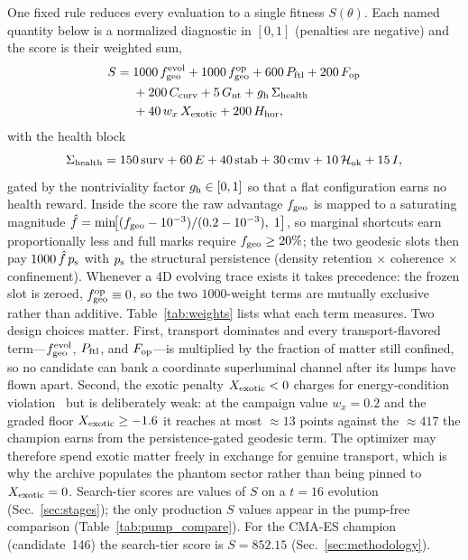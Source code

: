\documentclass[twocolumn,floatfix,aps,prd,nofootinbib]{revtex4-2}
\begin{document}
One fixed rule reduces every evaluation to a single fitness $S(\theta)$. Each
named quantity below is a normalized diagnostic in $[0,1]$ (penalties are
negative) and the score is their weighted sum,
\begin{align}
S =\;& 1000\,f_{\rm geo}^{\rm evol}
      + 1000\,f_{\rm geo}^{\rm op}
      + 600\,P_{\rm ftl}
      + 200\,F_{\rm op} \nonumber\\
   &  + 200\,C_{\rm curv}
      + 5\,G_{\rm nt}
      + g_{\rm h}\,\Sigma_{\rm health}\nonumber\\
   &  + 40\,w_{x}\,X_{\rm exotic}
      + 200\,H_{\rm hor},
\label{eq:score}
\end{align}
with the health block
\begin{equation}
\Sigma_{\rm health}=150\,\mathrm{surv}+60\,E+40\,\mathrm{stab}
+30\,\mathrm{cmv}+10\,\mathcal H_{\rm ok}+15\,I,
\end{equation}
gated by the nontriviality factor $g_{\rm h}\in[0,1]$ so that a flat
configuration earns no health reward. Inside the score the raw advantage
$f_{\rm geo}$ is mapped to a saturating magnitude
$\hat f=\min\!\bigl[(f_{\rm geo}-10^{-3})/(0.2-10^{-3}),\;1\bigr]$, so marginal
shortcuts earn proportionally less and full marks require
$f_{\rm geo}\ge20\%$; the two geodesic slots then pay $1000\,\hat f\,p_{\rm s}$
with $p_{\rm s}$ the structural persistence (density retention $\times$
coherence $\times$ confinement). Whenever a 4D evolving trace exists it takes
precedence: the frozen slot is zeroed, $f_{\rm geo}^{\rm op}\equiv0$, so the two
$1000$-weight terms are mutually exclusive rather than additive.
Table~\ref{tab:weights} lists what each
term measures. Two design choices matter. First, transport dominates and every
transport-flavored term---$f_{\rm geo}^{\rm evol}$, $P_{\rm ftl}$, and
$F_{\rm op}$---is multiplied by the fraction of matter still confined, so no
candidate can bank a coordinate superluminal channel after its lumps have flown
apart. Second, the exotic penalty $X_{\rm exotic}<0$ charges for
energy-condition violation~\cite{le2026warpax} but is deliberately weak: at the
campaign value $w_x=0.2$ and the graded floor $X_{\rm exotic}\ge-1.6$ it reaches
at most ${\approx}13$ points against the ${\approx}417$ the champion earns from
the persistence-gated geodesic term. The optimizer may therefore spend exotic
matter freely in exchange for genuine transport, which is why the archive
populates the phantom sector rather than being pinned to $X_{\rm exotic}=0$.
Search-tier scores are values of $S$ on a $t=16$ evolution
(Sec.~\ref{sec:stages}); the only production $S$ values appear in the
pump-free comparison (Table~\ref{tab:pump_compare}). For the CMA-ES champion
(candidate~146) the search-tier score is $S=852.15$
(Sec.~\ref{sec:methodology}).
\end{document}
